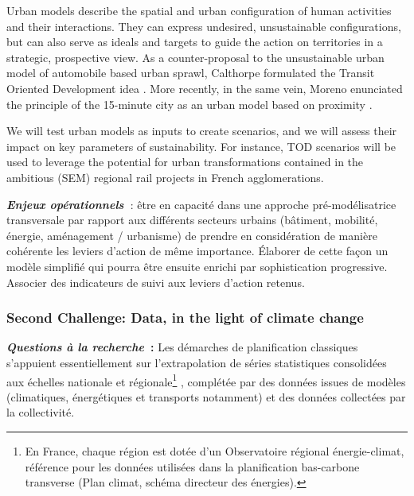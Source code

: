 Urban models describe the spatial and urban configuration of human activities and their interactions. They can express undesired, unsustainable configurations, but can also serve as ideals and targets to guide the action on territories in a strategic, prospective view. As a counter-proposal to the unsustainable urban model of automobile based urban sprawl, Calthorpe formulated the Transit Oriented Development idea \cite{calthorpeNextAmericanMetropolis1993}. More recently, in the same vein, Moreno enunciated the principle of the 15-minute city as an urban model based on proximity \cite{morenoIntroducing15MinuteCity2021}.

We will test urban models as inputs to create scenarios, and we will assess their impact on key parameters of sustainability.  For instance, TOD scenarios will be used to leverage the potential for urban transformations contained in the ambitious (SEM) regional rail projects in French agglomerations.

\textit{\textbf{Enjeux opérationnels }}: être en capacité dans une approche pré-modélisatrice transversale par rapport aux différents secteurs urbains (bâtiment, mobilité, énergie, aménagement / urbanisme) de prendre en considération de manière cohérente les leviers d’action de même importance. Élaborer de cette façon un modèle simplifié qui pourra être ensuite enrichi par sophistication progressive. Associer des indicateurs de suivi aux leviers d’action retenus.

\subsubsection{Second Challenge: Data, in the light of climate change}

\textit{\textbf{Questions à la recherche}}\textbf{ :} Les démarches de planification classiques s’appuient essentiellement sur l’extrapolation de séries statistiques consolidées aux échelles nationale et régionale\footnote{En France, chaque région est dotée d’un Observatoire régional énergie-climat, référence pour les données utilisées dans la planification bas-carbone transverse (Plan climat, schéma directeur des énergies).} , complétée par des données issues de modèles (climatiques, énergétiques et transports notamment) et des données collectées par la collectivité.  

